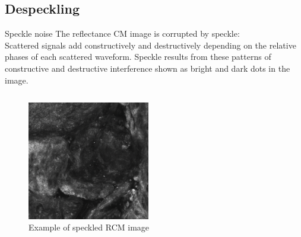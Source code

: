 \documentclass[t]{beamer}
\begin{document}
\subsection{Despeckling}

\begin{frame}{Speckle noise}
The reflectance CM image is corrupted by speckle:\\
Scattered signals add constructively and destructively depending on the relative phases of each scattered waveform.
Speckle results from these patterns of constructive and destructive interference shown as bright and dark dots in the image.

\begin{columns}

\begin{column}{0.5\textwidth}
\begin{figure}
\centering
\includegraphics[width=0.5\textwidth]{speckle-1}
\caption{Example of speckled RCM image}
\end{figure}
\end{column}

\begin{column}{0.5\textwidth}
\end{column}

\end{columns}

\end{frame}
\end{document}
